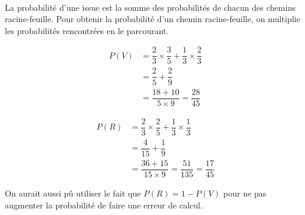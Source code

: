 {
	\, \\
	\begin{center}
	\end{center}
	La probabilité d'une issue est la somme des probabilités de chacun des chemins racine-feuille.
	Pour obtenir la probabilité d'un chemin racine-feuille, on multiplie les probabilités rencontrées en le parcourant.
	
		\begin{align*}
			P(V) &= \dfrac23 \times \dfrac35 + \dfrac13 \times \dfrac23 \\
				&= \dfrac25 + \dfrac29 \\
				&= \dfrac{18 + 10}{5 \times 9} = \dfrac{28}{45}
		\end{align*}
	
		\begin{align*}
			P(R) &= \dfrac23 \times \dfrac25 + \dfrac13 \times \dfrac13 \\
				&= \dfrac4{15} + \dfrac19 \\
				&= \dfrac{36 + 15}{15 \times 9} = \dfrac{51}{135} = \dfrac{17}{45}
		\end{align*}
		
		On aurait aussi pû utiliser le fait que $P(R) = 1 - P(V)$ pour ne pas augmenter la probabilité de faire une erreur de calcul.
}


